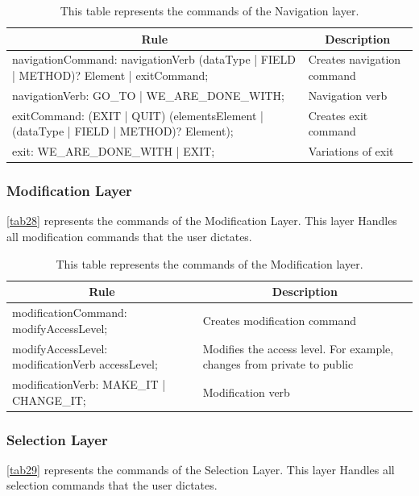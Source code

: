 \begin{table}[H]
	\centering
	\begin{tabular}{|p{8cm}|p{7cm}|}
		\hline
		\multicolumn{1}{|c|}{{\bf Rule}} & \multicolumn{1}{c|}{{\bf Description}} \\ \hline
		navigationCommand: navigationVerb (dataType | FIELD | METHOD)? Element | exitCommand; & Creates navigation command             \\ \hline
		navigationVerb: GO\_TO | WE\_ARE\_DONE\_WITH; & Navigation verb                        \\ \hline
		exitCommand: (EXIT | QUIT) (elementsElement | (dataType | FIELD | METHOD)? Element);  & Creates exit command                   \\ \hline
		exit: WE\_ARE\_DONE\_WITH | EXIT; & Variations of exit                     \\ \hline
	\end{tabular}
		\caption{This table represents the commands of the Navigation layer.}
		\label{tab27}
\end{table}

\subsubsection{Modification Layer}
\autoref{tab28} represents the commands of the Modification Layer. This layer Handles all modification commands that the user dictates.

\begin{table}[H]
	\centering
	\begin{tabular}{|p{8cm}|p{7cm}|}
		\hline
		\multicolumn{1}{|c|}{{\bf Rule}}                 & \multicolumn{1}{c|}{{\bf Description}}                                 \\ \hline
		modificationCommand: modifyAccessLevel;          & Creates modification command                                           \\ \hline
		modifyAccessLevel: modificationVerb accessLevel; & Modifies the access level. For example, changes from private to public \\ \hline
		modificationVerb: MAKE\_IT | CHANGE\_IT;         & Modification verb                                                      \\ \hline
	\end{tabular}
		\caption{This table represents the commands of the Modification layer.}
		\label{tab28}
\end{table}

\subsubsection{Selection Layer}
\autoref{tab29} represents the commands of the Selection Layer.  This layer Handles all selection commands that the user dictates.


